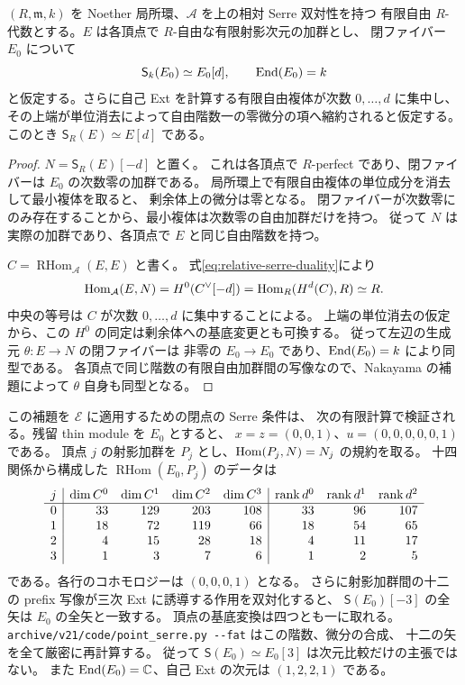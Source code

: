 \begin{lemma}\label{lem:relative-serre-fixed}
$(R,\mathfrak m,k)$ を Noether 局所環、$\mathcal A$ を上の相対 Serre 双対性を持つ
有限自由 $R$-代数とする。$E$ は各頂点で $R$-自由な有限射影次元の加群とし、
閉ファイバー $E_0$ について
\[
 \mathsf S_k(E_0)\simeq E_0[d],\qquad \operatorname{End}(E_0)=k
\]
と仮定する。さらに自己 Ext を計算する有限自由複体が次数 $0,\ldots,d$ に集中し、
その上端が単位消去によって自由階数一の零微分の項へ縮約されると仮定する。
このとき $\mathsf S_R(E)\simeq E[d]$ である。
\end{lemma}

\begin{proof}
$N=\mathsf S_R(E)[-d]$ と置く。
これは各頂点で $R$-perfect であり、閉ファイバーは $E_0$ の次数零の加群である。
局所環上で有限自由複体の単位成分を消去して最小複体を取ると、
剰余体上の微分は零となる。
閉ファイバーが次数零にのみ存在することから、最小複体は次数零の自由加群だけを持つ。
従って $N$ は実際の加群であり、各頂点で $E$ と同じ自由階数を持つ。

$C=\operatorname{RHom}_{\mathcal A}(E,E)$ と書く。
式\eqref{eq:relative-serre-duality}により
\[
 \operatorname{Hom}_{\mathcal A}(E,N)
 =H^0(C^\vee[-d])
 =\operatorname{Hom}_R(H^d(C),R)\simeq R.
\]
中央の等号は $C$ が次数 $0,\ldots,d$ に集中することによる。
上端の単位消去の仮定から、この $H^0$ の同定は剰余体への基底変更とも可換する。
従って左辺の生成元 $\theta:E\to N$ の閉ファイバーは
非零の $E_0\to E_0$ であり、$\operatorname{End}(E_0)=k$ により同型である。
各頂点で同じ階数の有限自由加群間の写像なので、Nakayama の補題によって
$\theta$ 自身も同型となる。
\end{proof}

この補題を $\mathcal E$ に適用するための閉点の Serre 条件は、
次の有限計算で検証される。残留 thin module を $E_0$ とすると、
$x=z=(0,0,1)$、$u=(0,0,0,0,0,1)$ である。
頂点 $j$ の射影加群を $P_j$ とし、$\operatorname{Hom}(P_j,N)=N_j$ の規約を取る。
十四関係から構成した $\operatorname{RHom}(E_0,P_j)$ のデータは
\[
\begin{array}{c|rrrr|rrr}
j&\dim C^0&\dim C^1&\dim C^2&\dim C^3
 &\operatorname{rank} d^0&\operatorname{rank} d^1&\operatorname{rank} d^2\\\hline
0&33&129&203&108&33&96&107\\
1&18&72&119&66&18&54&65\\
2&4&15&28&18&4&11&17\\
3&1&3&7&6&1&2&5
\end{array}
\]
である。各行のコホモロジーは $(0,0,0,1)$ となる。
さらに射影加群間の十二の prefix 写像が三次 Ext に誘導する作用を双対化すると、
$\mathsf S(E_0)[-3]$ の全矢は $E_0$ の全矢と一致する。
頂点の基底変換は四つとも一に取れる。
\nolinkurl{archive/v21/code/point_serre.py --fat} はこの階数、微分の合成、
十二の矢を全て厳密に再計算する。
従って $\mathsf S(E_0)\simeq E_0[3]$ は次元比較だけの主張ではない。
また $\operatorname{End}(E_0)=\mathbb C$、自己 Ext の次元は $(1,2,2,1)$ である。

